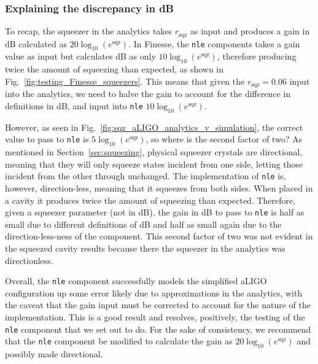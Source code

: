 \documentclass[aps,pra,superscriptaddress,reprint,nofootinbib]{revtex4-1}
\newcommand{\code}[1]{\texttt{#1}}
\begin{document}
\subsubsection{Explaining the discrepancy in dB}

To recap, the squeezer in the analytics takes $r_\mathrm{sqz}$ as input and produces a gain in dB calculated as $20 \log_{10}(e^\mathrm{sqz})$. In Finesse, the \code{nle} components takes a gain value as input but calculates dB as only $10 \log_{10}(e^\mathrm{sqz})$, therefore producing twice the amount of squeezing than expected, as shown in Fig.~\ref{fig:testing_Finesse_squeezers}. This means that given the $r_\mathrm{sqz} = 0.06$ input into the analytics, we need to halve the gain to account for the difference in definitions in dB, and input into \code{nle} $10 \log_{10}(e^\mathrm{sqz})$.


However, as seen in Fig.~\ref{fig:sqz_aLIGO_analytics_v_simulation}, the correct value to pass to \code{nle} is $5 \log_{10}(e^\mathrm{sqz})$, so where is the second factor of two? As mentioned in Section~\ref{sec:squeezing}, physical squeezer crystals are directional, meaning that they will only squeeze states incident from one side, letting those incident from the other through unchanged. The implementation of \code{nle} is, however, direction-less, meaning that it squeezes from both sides. When placed in a cavity it produces twice the amount of squeezing than expected. Therefore, given a squeezer parameter (not in dB), the gain in dB to pass to \code{nle} is half as small due to different definitions of dB and half as small again due to the direction-less-ness of the component. This second factor of two was not evident in the squeezed cavity results because there the squeezer in the analytics was directionless.


Overall, the \code{nle} component successfully models the simplified aLIGO configuration up some error likely due to approximations in the analytics, with the caveat that the gain input must be corrected to account for the nature of the implementation. This is a good result and resolves, positively, the testing of the \code{nle} component that we set out to do. For the sake of consistency, we recommend that the \code{nle} component be modified to calculate the gain as $20 \log_{10}(e^\mathrm{sqz})$ and possibly made directional.
\end{document}

